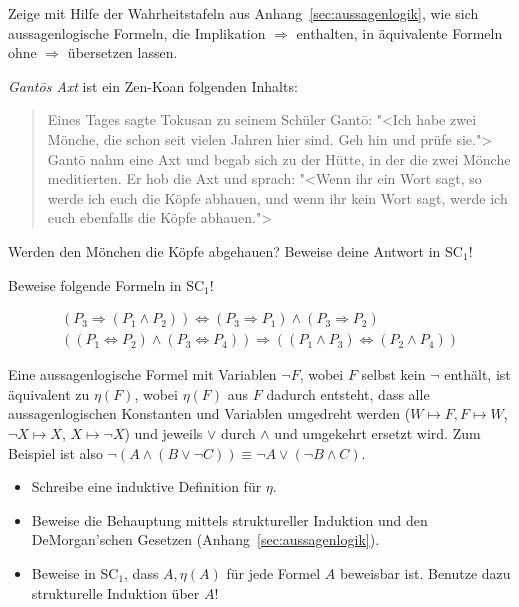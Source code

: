 \begin{aufgabe}
  Zeige mit Hilfe der Wahrheitstafeln aus
  Anhang~\ref{sec:aussagenlogik}, wie sich aussagenlogische
  Formeln, die Implikation $\Rightarrow$ enthalten, in äquivalente
  Formeln ohne $\Rightarrow$ übersetzen lassen.
\end{aufgabe}

\begin{aufgabe}
  \textit{Gant\=os Axt} ist ein Zen-Koan folgenden Inhalts:
  \begin{quote}
    Eines Tages sagte Tokusan zu seinem Schüler Gant\=o: "<Ich habe
    zwei Mönche, die schon seit vielen Jahren hier sind.  Geh hin und
    prüfe sie."> Gant\=o nahm eine Axt und begab sich zu der Hütte, in
    der die zwei Mönche meditierten.  Er hob die Axt und sprach:
    "<Wenn ihr ein Wort sagt, so werde ich euch die Köpfe abhauen, und
    wenn ihr kein Wort sagt, werde ich euch ebenfalls die Köpfe
    abhauen.">
  \end{quote}
  Werden den Mönchen die Köpfe abgehauen?  Beweise deine Antwort in
  SC$_1$!
\end{aufgabe}

\begin{aufgabe}
  Beweise folgende Formeln in SC$_1$!

    \begin{displaymath}
      \begin{array}{c}
      (P_3\Rightarrow(P_1\wedge P_2))\Leftrightarrow (P_3\Rightarrow P_1)\wedge
      (P_3\Rightarrow P_2)
      \\[1.5ex]
      ((P_1 \Leftrightarrow P_2)\wedge(P_3\Leftrightarrow
      P_4))\Rightarrow((P_1\wedge P_3)\Leftrightarrow (P_2\wedge P_4))
    \end{array}
  \end{displaymath}
\end{aufgabe}

\begin{aufgabe}\label{ex:negation}
 Eine aussagenlogische Formel mit Variablen $\neg
  F$, wobei $F$ selbst kein $\neg$ enthält, ist äquivalent zu $\eta(F)$, wobei $\eta(F)$ aus $F$ dadurch
  entsteht, dass alle aussagenlogischen Konstanten und Variablen umgedreht werden
  ($W\mapsto F, F\mapsto W$, $\neg X\mapsto X$, $X \mapsto \neg X$)
  und jeweils $\vee$ durch  $\wedge$ und umgekehrt ersetzt wird.  Zum
  Beispiel ist also $\neg(A\wedge(B\vee \neg C)) \equiv \neg A\vee (\neg B\wedge C)$.

  \begin{itemize}
  \item Schreibe eine induktive Definition für $\eta$.
  \item Beweise die Behauptung mittels struktureller Induktion und den
    DeMorgan'schen Gesetzen (Anhang~\ref{sec:aussagenlogik}).
    \item Beweise in SC$_1$, dass $A,\eta(A)$ für
    jede Formel $A$ beweisbar ist.
    Benutze dazu strukturelle Induktion über
    $A$!
  \end{itemize}
\end{aufgabe}

